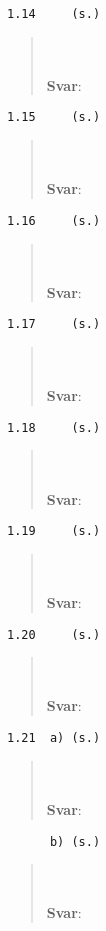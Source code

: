 \documentclass[a4paper]{article}
\newcommand{\tskcol}[1]{\textcolor{tskcol}{#1}}
\begin{document}
\texttt{\tskcol{1.14~~~~ (s.)}}
\begin{quotation}
	\noindent
	\\ \\
	\textbf{Svar}:
\end{quotation}

\texttt{\tskcol{1.15~~~~ (s.)}}
\begin{quotation}
	\noindent
	\\ \\
	\textbf{Svar}:
\end{quotation}

\texttt{\tskcol{1.16~~~~ (s.)}}
\begin{quotation}
	\noindent
	\\ \\
	\textbf{Svar}:
\end{quotation}

\texttt{\tskcol{1.17~~~~ (s.)}}
\begin{quotation}
	\noindent
	\\ \\
	\textbf{Svar}:
\end{quotation}

\texttt{\tskcol{1.18~~~~ (s.)}}
\begin{quotation}
	\noindent
	\\ \\
	\textbf{Svar}:
\end{quotation}

\texttt{\tskcol{1.19~~~~ (s.)}}
\begin{quotation}
	\noindent
	\\ \\
	\textbf{Svar}:
\end{quotation}

\texttt{\tskcol{1.20~~~~ (s.)}}
\begin{quotation}
	\noindent
	\\ \\
	\textbf{Svar}:
\end{quotation}

\texttt{\tskcol{1.21~~a) (s.)}}
\begin{quotation}
	\noindent
	\\ \\
	\textbf{Svar}:
\end{quotation}

\texttt{\tskcol{~~~~~~b) (s.)}}
\begin{quotation}
	\noindent
	\\ \\
	\textbf{Svar}:
\end{quotation}
\end{document}
